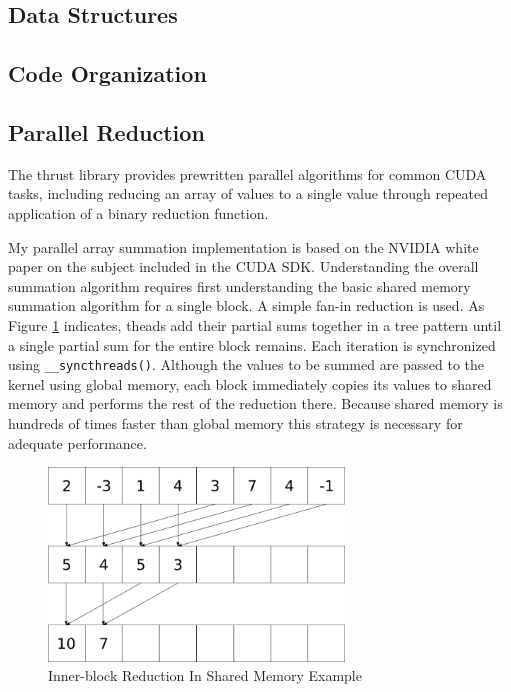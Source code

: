 \documentclass{article}
\begin{document}
\subsection{Data Structures}

\subsection{Code Organization}

\subsection{Parallel Reduction}
The thrust library provides prewritten parallel algorithms for common CUDA tasks, including reducing an array of values to a single value through repeated application of a binary reduction function.\cite{thrust}

My parallel array summation implementation is based on the NVIDIA white paper on the subject included in the CUDA SDK.\cite{oprc} Understanding the overall summation algorithm requires first understanding the basic shared memory summation algorithm for a single block. A simple fan-in reduction is used. As Figure \ref{sum1} indicates, theads add their partial sums together in a tree pattern until a single partial sum for the entire block remains. Each iteration is synchronized using \verb!__syncthreads()!. Although the values to be summed are passed to the kernel using global memory, each block immediately copies its values to shared memory and performs the rest of the reduction there. Because shared memory is hundreds of times faster than global memory\cite{tutorial1} this strategy is necessary for adequate performance.

\begin{figure}
\centering
\includegraphics[width=0.7\textwidth]{data/summation.png}
\caption{Inner-block Reduction In Shared Memory Example}
\label{sum1}
\end{figure}
\end{document}
